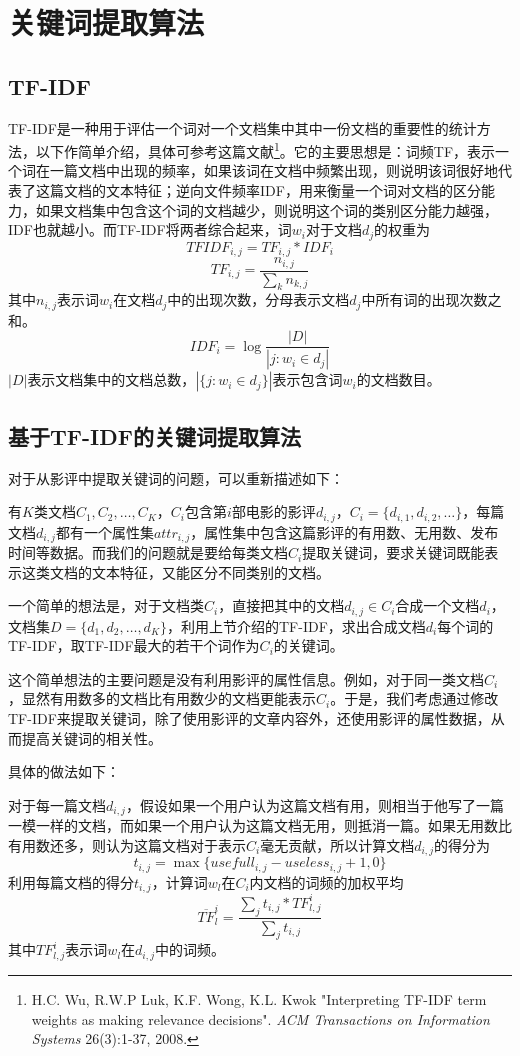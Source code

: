 \documentclass[a4paper, nofonts, nocap]{ctexart}
\begin{document}
\section{关键词提取算法}
\subsection{TF-IDF}
TF-IDF是一种用于评估一个词对一个文档集中其中一份文档的重要性的统计方法，以下作简单介绍，具体可参考这篇文献\footnote{H.C. Wu, R.W.P Luk, K.F. Wong, K.L. Kwok "Interpreting TF-IDF term weights as making relevance decisions". \textit{ACM Transactions on Information Systems} 26(3):1-37, 2008.}。它的主要思想是：词频TF，表示一个词在一篇文档中出现的频率，如果该词在文档中频繁出现，则说明该词很好地代表了这篇文档的文本特征；逆向文件频率IDF，用来衡量一个词对文档的区分能力，如果文档集中包含这个词的文档越少，则说明这个词的类别区分能力越强，IDF也就越小。而TF-IDF将两者综合起来，词$w_i$对于文档$d_j$的权重为
\[ TFIDF_{i, j} = TF_{i, j} * IDF_i \]
\[ TF_{i, j} = \frac{n_{i, j}}{\sum_k n_{k, j}} \]
其中$n_{i, j}$表示词$w_i$在文档$d_j$中的出现次数，分母表示文档$d_j$中所有词的出现次数之和。
\[ IDF_i = \log \frac{|D|}{|{j:w_i \in d_j}|} \]
$|D|$表示文档集中的文档总数，$|\{j:w_i \in d_j\}|$表示包含词$w_i$的文档数目。

\subsection{基于TF-IDF的关键词提取算法}
对于从影评中提取关键词的问题，可以重新描述如下：

有$K$类文档$C_1, C_2, \dots, C_K$，$C_i$包含第$i$部电影的影评$d_{i, j}$，$C_i = \{d_{i, 1}, d_{i, 2}, \dots \}$，每篇文档$d_{i, j}$都有一个属性集$attr_{i, j}$，属性集中包含这篇影评的有用数、无用数、发布时间等数据。而我们的问题就是要给每类文档$C_i$提取关键词，要求关键词既能表示这类文档的文本特征，又能区分不同类别的文档。

一个简单的想法是，对于文档类$C_i$，直接把其中的文档$d_{i, j} \in C_i$合成一个文档$d_i$，文档集$D = \{d_1, d_2, \dots, d_K\}$，利用上节介绍的TF-IDF，求出合成文档$d_i$每个词的TF-IDF，取TF-IDF最大的若干个词作为$C_i$的关键词。

这个简单想法的主要问题是没有利用影评的属性信息。例如，对于同一类文档$C_i$，显然有用数多的文档比有用数少的文档更能表示$C_i$。于是，我们考虑通过修改TF-IDF来提取关键词，除了使用影评的文章内容外，还使用影评的属性数据，从而提高关键词的相关性。

具体的做法如下：

对于每一篇文档$d_{i, j}$，假设如果一个用户认为这篇文档有用，则相当于他写了一篇一模一样的文档，而如果一个用户认为这篇文档无用，则抵消一篇。如果无用数比有用数还多，则认为这篇文档对于表示$C_i$毫无贡献，所以计算文档$d_{i, j}$的得分为
\[ t_{i, j} = \max \{usefull_{i, j} - useless_{i, j} + 1, 0\} \]
利用每篇文档的得分$t_{i, j}$，计算词$w_l$在$C_i$内文档的词频的加权平均
\[ \overline{TF}_l^i = \frac{\sum_j t_{i, j}*TF_{l, j}^i}{\sum_j t_{i, j}} \]
其中$TF_{l, j}^i$表示词$w_l$在$d_{i, j}$中的词频。
\end{document}
